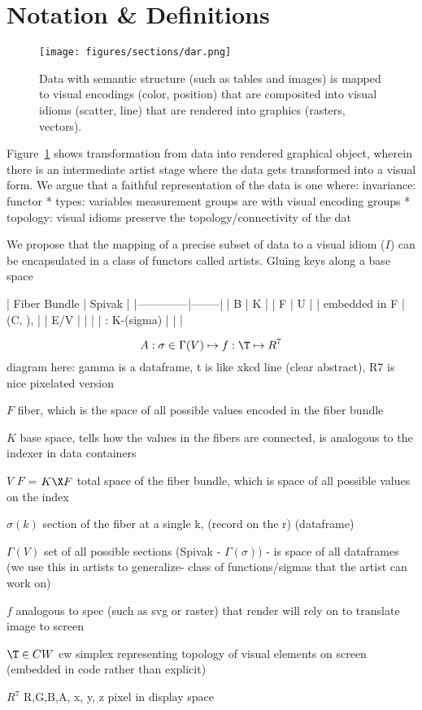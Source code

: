 \documentclass[../intro.tex]{subfiles}
\begin{document}
\section{Notation \& Definitions}
\begin{figure}
    \texttt{[image: figures/sections/dar.png]}
    \caption{Data with semantic structure (such as tables and images) is mapped to visual encodings (color, position) that are composited into visual idioms (scatter, line) that are rendered into graphics (rasters, vectors).}
    \label{fig:artists}
\end{figure}
Figure~\ref{fig:artists} shows transformation from data into rendered graphical object, wherein there is an intermediate artist stage where the data gets transformed into a visual form. We argue that a faithful representation of the data is one where:
invariance:
functor
* types: variables measurement groups are  with visual encoding groups
* topology: visual idioms preserve the topology/connectivity of the dat


We propose that the mapping of a precise subset of data to a visual idiom ($I$) can be encapsulated in a class of functors called artists.
Gluing keys along a base space

| Fiber Bundle | Spivak |
|--------------|--------|
| B | K |
| F | U |
| embedded in F  | (C, \sigma), \pi |
| E/V |  |
|   | \tau:  K-\Gamma(sigma) |
|   |

\begin{equation}
    A: {\sigma \in \Gamma(V)}\mapsto f:\T \mapsto R^{7}
\end{equation}
diagram here: gamma is a dataframe, t is like xkcd line (clear abstract), R7 is nice pixelated version 
\begin{definition}
    \item[$F$] fiber, which is the space of all possible values encoded in the fiber bundle
    \item[$K$] base space, tells how the values in the fibers are connected, is analogous to the indexer in data containers
    \item[$V$] $F$ = $K \X F$ total space of the fiber bundle, which is space of all possible values on the index 
    \item[$\sigma(k)$] section of the fiber at a single k, (record on the  r) (dataframe)
    \item[$\Gamma(V)$] set of all possible sections (Spivak - $\Gamma(\sigma))$ - is space of all dataframes (we use this in artists to generalize- class of functions/sigmas that the artist can work on)
    \item[$f$] analogous to spec (such as svg or raster) that render will rely on to translate image to screen
    \item[$\T \in CW$] cw simplex representing topology of visual elements on screen (embedded in code rather than explicit) 
    \item[$R^{7}$]  {R,G,B,A, x, y, z} pixel in display space
\end{definition}
\end{document}
